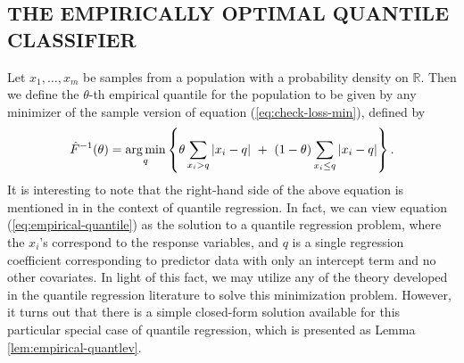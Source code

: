 \subsection{THE EMPIRICALLY OPTIMAL QUANTILE CLASSIFIER}
\label{sec:empirical-classifier}

Let $x_1, \dots, x_m$ be samples from a population with a probability density on
$\mathbb{R}$.  Then we define the $\theta$-th empirical quantile for the
population to be given by any minimizer of the sample version of equation
(\ref{eq:check-loss-min}), defined by
\begin{equation}
  \label{eq:empirical-quantile}
  \hat{F}^{-1} (\theta) = \operatorname*{arg\,min}_q \left\{
    \theta \sum_{ x_{i} > q } |x_{i} - q| ~+~
    (1 - \theta) \sum_{ x_{i} \leq q } |x_{i} - q|
  \right\}.
\end{equation}
It is interesting to note that the right-hand side of the above equation is
mentioned in \cite{koenker1978} in the context of quantile regression.  In
fact, we can view equation (\ref{eq:empirical-quantile}) as the solution to a
quantile regression problem, where the $x_i$'s correspond to the response
variables, and $q$ is a single regression coefficient corresponding to predictor
data with only an intercept term and no other covariates.  In light of this
fact, we may utilize any of the theory developed in the quantile regression
literature to solve this minimization problem.  However, it turns out that there
is a simple closed-form solution available for this particular special case of
quantile regression, which is presented as Lemma \ref{lem:empirical-quantlev}.


